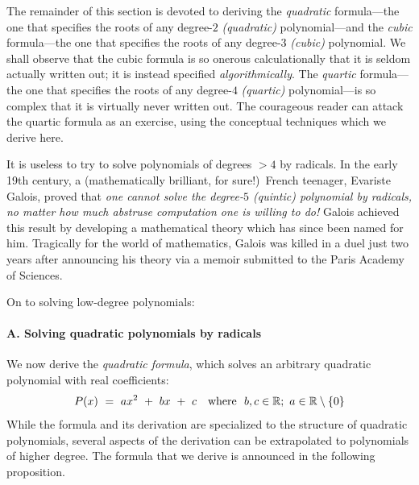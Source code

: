   

\medskip

The remainder of this section is devoted to deriving the {\em quadratic} formula---the one that specifies the roots of any degree-$2$ {\it (quadratic)}  polynomial---and the {\em cubic} formula---the one that specifies the roots of any degree-$3$ {\it (cubic)} polynomial.  We shall observe that the cubic formula is so onerous calculationally that it is seldom actually written out; it is instead specified {\em algorithmically}.  The {\em quartic} formula---the one that specifies the roots of any degree-$4$ {\it (quartic)}  polynomial---is so complex that it is virtually never written out.  The courageous reader can attack the quartic formula as an exercise, using the conceptual techniques which we derive here.

   

\smallskip

It is useless to try to solve polynomials of degrees $> 4$ by radicals.  In the early 19th century, a (mathematically brilliant, for sure!)~French teenager, Evariste Galois, proved that {\em one cannot solve the degree-$5$ {\it (quintic)} polynomial by radicals, no matter how much abstruse computation one is willing to do!}  Galois achieved this result by developing a mathematical theory which has since been named for him.  Tragically for the world of mathematics, Galois was killed in a duel just two years after announcing his theory via a memoir submitted to the Paris Academy of Sciences.

\bigskip

\noindent
On to solving low-degree polynomials:

\paragraph{A. Solving quadratic polynomials by radicals}

 
We now derive the {\it quadratic formula}, which solves an arbitrary quadratic polynomial with real coefficients:  
\begin{equation}
\label{eq:generic-quadratic-1}
P(x) \ = \  ax^2 \ + \ bx \ + \ c \ \ \mbox{  where  } \ b,c \in \mathbb{R};
\ a \in \mathbb{R} \setminus \{0\}
\end{equation}
While the formula and its derivation are specialized to the structure of quadratic polynomials, several aspects of the derivation can be extrapolated to polynomials of higher degree.  The formula that we derive is announced in the following proposition.  

